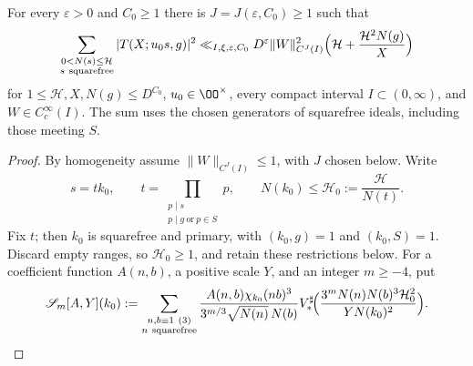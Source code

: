 \begin{lemma}\label{lem:squarefree-completed}
For every $\varepsilon>0$ and $C_0\ge1$ there is
$J=J(\varepsilon,C_0)\ge1$ such that
\begin{equation}\label{eq:squarefree-completed}
 \sum_{\substack{0<N(s)\le\mathcal H\\s\ {\rm squarefree}}}
 |T(X;u_0s,g)|^2
 \ll_{I,\xi,\varepsilon,C_0}D^\varepsilon\|W\|_{C^J(I)}^2
 \Bigl(\mathcal H+\frac{\mathcal H^2N(g)}X\Bigr)
\end{equation}
for $1\le\mathcal H,X,N(g)\le D^{C_0}$, $u_0\in\OO^\times$,
every compact interval $I\subset(0,\infty)$, and $W\in C_c^\infty(I)$.
The sum uses the chosen generators of squarefree ideals, including
those meeting $S$.
\end{lemma}
\begin{proof}
By homogeneity assume $\|W\|_{C^J(I)}\le1$, with $J$ chosen below.
Write
\[
 s=t k_0,\qquad
 t=\prod_{\substack{p\mid s\\p\mid g\ \text{or}\ p\in S}}p,\qquad
 N(k_0)\le\mathcal H_0:=\frac{\mathcal H}{N(t)}.
\]
Fix $t$; then $k_0$ is squarefree and primary, with
$(k_0,g)=1$ and $(k_0,S)=1$. Discard empty ranges, so
$\mathcal H_0\ge1$, and retain these restrictions below.
For a coefficient function $A(n,b)$, a positive scale $Y$, and an integer $m\ge-4$, put
\begin{equation}\label{eq:prepared-theta-sum}
 \mathscr S_m[A,Y](k_0):=
 \sum_{\substack{n,b\equiv1\ (3)\\n\ {\rm squarefree}}}
 \frac{A(n,b)\chi_{k_0}(nb)^3}{3^{m/3}\sqrt{N(n)}\,N(b)}
 V_*^\sharp\!\Bigl(\frac{3^mN(n)N(b)^3\mathcal H_0^2}
 {YN(k_0)^2}\Bigr).
\end{equation}


\end{proof}
